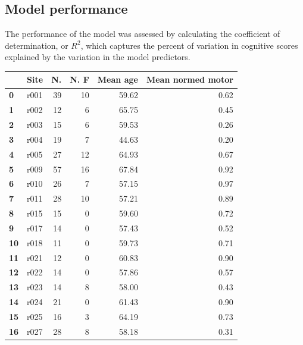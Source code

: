 \documentclass[10pt]{article}
\begin{document}
\subsection{Model performance}
The performance of the model was assessed by calculating the coefficient of determination, or $R^2$, which captures the percent of variation in cognitive scores explained by the variation in the model predictors. 




\begin{tabular}{|l|l|r|r|r|r|}
\hline {} &  Site &   N. &  N. F &  Mean age &  Mean normed motor \\ \hline
\textbf{0 } &  r001 &  39 &         10 &     59.62 &               0.62 \\ 
\textbf{1 } &  r002 &  12 &          6 &     65.75 &               0.45 \\
\textbf{2 } &  r003 &  15 &          6 &     59.53 &               0.26 \\ 
\textbf{3 } &  r004 &  19 &          7 &     44.63 &               0.20 \\ 
\textbf{4 } &  r005 &  27 &         12 &     64.93 &               0.67 \\
\textbf{5 } &  r009 &  57 &         16 &     67.84 &               0.92 \\ 
\textbf{6 } &  r010 &  26 &          7 &     57.15 &               0.97 \\ 
\textbf{7 } &  r011 &  28 &         10 &     57.21 &               0.89 \\ 
\textbf{8 } &  r015 &  15 &          0 &     59.60 &               0.72 \\ 
\textbf{9 } &  r017 &  14 &          0 &     57.43 &               0.52 \\
\textbf{10} &  r018 &  11 &          0 &     59.73 &               0.71 \\ 
\textbf{11} &  r021 &  12 &          0 &     60.83 &               0.90 \\
\textbf{12} &  r022 &  14 &          0 &     57.86 &               0.57 \\ 
\textbf{13} &  r023 &  14 &          8 &     58.00 &               0.43 \\ 
\textbf{14} &  r024 &  21 &          0 &     61.43 &               0.90 \\ 
\textbf{15} &  r025 &  16 &          3 &     64.19 &               0.73 \\ 
\textbf{16} &  r027 &  28 &          8 &     58.18 &               0.31 \\

\end{tabular}
\end{document}
